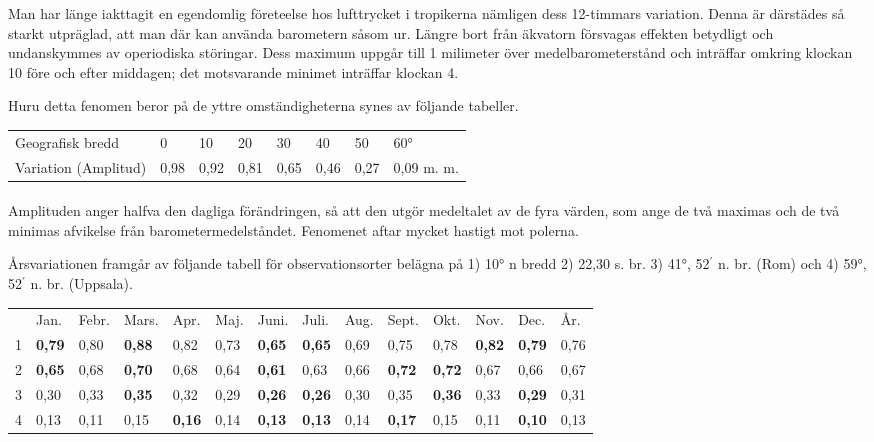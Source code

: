 \documentclass[a4paper, 12pt, oneside, swedish]{article}
\begin{document}
Man har länge iakttagit en egendomlig företeelse hos lufttrycket i tropikerna nämligen dess 12-timmars variation. Denna är därstädes så starkt utpräglad, att man där kan använda barometern såsom ur. Längre bort från äkvatorn försvagas effekten betydligt och undanskymmes av operiodiska störingar. Dess maximum uppgår till 1 milimeter över medelbarometerstånd och inträffar omkring klockan 10 före och efter middagen; det motsvarande minimet inträffar klockan 4.

Huru detta fenomen beror på de yttre omständigheterna synes av följande tabeller.

\begin{table}[H]
    \centering
    \footnotesize
    \Fontauri
    \begin{tabular}{l l l l l l l l}
        Geografisk bredd & 0 & 10 & 20 & 30 & 40 & 50 & 60°   \\
        Variation (Amplitud) & 0,98 & 0,92 & 0,81 & 0,65 & 0,46 & 0,27 & 0,09 m. m. \\
    \end{tabular}
\end{table}
\paragraph{}
Amplituden anger halfva den dagliga förändringen, så att den utgör medeltalet av de fyra värden, som ange de två maximas och de två minimas afvikelse från barometermedelståndet. Fenomenet aftar mycket hastigt mot polerna.

Årsvariationen framgår av följande tabell för observationsorter belägna på 1) 10° n bredd 2) 22,30 s. br. 3) 41°, 52$^{\prime}$ n. br. (Rom) och 4) 59°, 52$^{\prime}$ n. br. (Uppsala).

\begin{table}[H]
    \centering
    \footnotesize
    \Fontauri
    \begin{tabular}{p{3mm} p{5mm} p{5mm} p{6mm} p{5mm} p{5mm} p{5mm} p{5mm} p{5mm} p{5mm} p{5mm} p{5mm} p{5mm} p{5mm}}
        ~ & Jan. & Febr. & Mars. & Apr. & Maj. & Juni. & Juli. & Aug. & Sept. & Okt. & Nov. & Dec. & År. \\
        1 & \textbf{0,79} & 0,80 & \textbf{0,88} & 0,82 & 0,73 & \textbf{0,65} & \textbf{0,65} & 0,69 & 0,75 & 0,78 & \textbf{0,82} & \textbf{0,79} & 0,76 \\
        2 & \textbf{0,65} & 0,68 & \textbf{0,70} & 0,68 & 0,64 & \textbf{0,61} & 0,63 & 0,66 & \textbf{0,72} & \textbf{0,72} & 0,67 & 0,66 & 0,67 \\
        3 & 0,30 & 0,33 & \textbf{0,35} & 0,32 & 0,29 & \textbf{0,26} & \textbf{0,26} & 0,30 & 0,35 & \textbf{0,36} & 0,33 & \textbf{0,29} & 0,31 \\
        4 & 0,13 & 0,11 & 0,15 & \textbf{0,16} & 0,14 & \textbf{0,13} & \textbf{0,13} & 0,14 & \textbf{0,17} & 0,15 & 0,11 & \textbf{0,10} & 0,13 \\
    \end{tabular}
\end{table}
\end{document}
